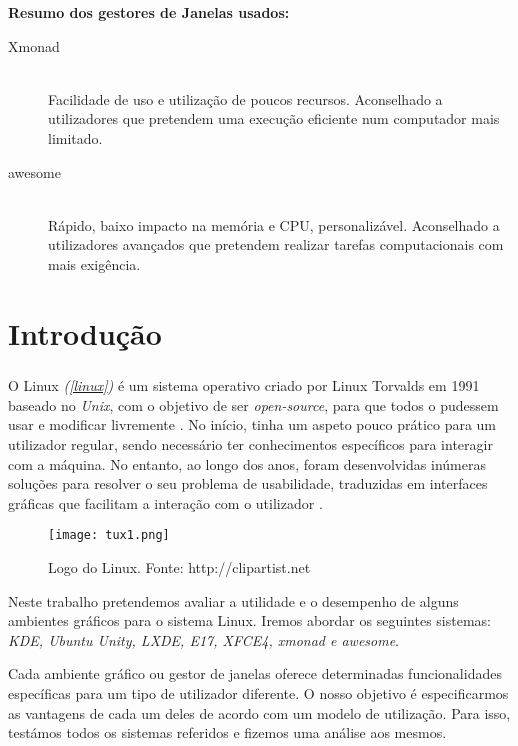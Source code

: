 \documentclass[11pt,openright,twoside]{report}
\begin{document}
  \textbf{Resumo dos gestores de Janelas usados:}
  
  \begin{description}

  \item[Xmonad] \hfill \\
  Facilidade de uso e utilização de poucos recursos. Aconselhado a utilizadores que pretendem uma execução eficiente num computador mais limitado.
  
  \item[awesome] \hfill \\
  Rápido, baixo impacto na memória e CPU, personalizável. Aconselhado a utilizadores avançados que pretendem realizar tarefas computacionais com mais exigência.
 
  \end{description}

\chapter{Introdução}

\paragraph{  }O Linux {\it (\autoref{linux})} é um sistema operativo criado por Linux Torvalds em 1991 baseado no \textit{Unix}, com o objetivo de ser {\it open-source}, para que todos o pudessem usar e modificar livremente \cite{Linux}. No início, tinha um aspeto pouco prático para um utilizador regular, sendo necessário ter conhecimentos específicos para interagir com a máquina. No entanto, ao longo dos anos, foram desenvolvidas inúmeras soluções para resolver o seu problema de usabilidade, traduzidas em interfaces gráficas que facilitam a interação com o utilizador \cite{Ambientesgraficos}.

\begin{figure}
 \center
 \texttt{[image: tux1.png]}
 \caption{Logo do Linux. Fonte: http://clipartist.net}
 \label{linux}
\end{figure}


Neste trabalho pretendemos avaliar a utilidade e o desempenho de alguns ambientes gráficos para o sistema Linux. Iremos abordar os seguintes sistemas: {\it KDE, Ubuntu Unity, LXDE, E17, XFCE4, xmonad e awesome}.

Cada ambiente gráfico ou gestor de janelas oferece determinadas funcionalidades específicas para um tipo de utilizador diferente. O nosso objetivo é especificarmos as vantagens de cada um deles de acordo com um modelo de utilização. Para isso, testámos todos os sistemas referidos e fizemos uma análise aos mesmos.
\end{document}
